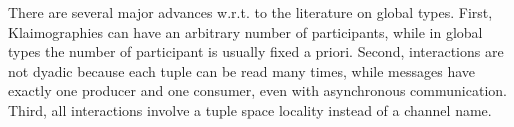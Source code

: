 There are several major advances w.r.t. to the literature on global types.
First, Klaimographies can have an arbitrary number of participants, while in global types the number of participant is usually fixed a priori.
Second, interactions are not dyadic because each tuple can be read many times, while messages have exactly one producer and one consumer, even with asynchronous communication.
Third, all interactions involve a tuple space locality instead of a channel name.



